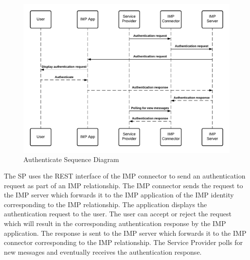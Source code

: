 \begin{figure}[H]
    \centering
    \includegraphics[scale=0.6]{Diagrams/IMP Use Case Authenticate Sequence Diagram.pdf}
    \caption{Authenticate Sequence Diagram}
    \label{imp:authenticate}
\end{figure}

The SP uses the REST interface of the IMP connector to send an authentication request as part of an IMP relationship. The IMP connector sends the request to the IMP server which forwards it to the IMP application of the IMP identity corresponding to the IMP relationship. The application displays the authentication request to the user. The user can accept or reject the request which will result in the corresponding authentication response by the IMP application. The response is sent to the IMP server which forwards it to the IMP connector corresponding to the IMP relationship. The Service Provider polls for new messages and eventually receives the authentication response.